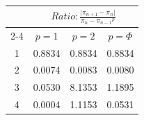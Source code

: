 \documentclass{article}
\providecommand{\abs}[1]{\lvert#1\rvert}
\begin{document}
\begin{tabular}{|c|c|c|c|}
\hline
\n & \multicolumn{3}{|c|}{$Ratio:\displaystyle\frac{\abs{\pi_{n+1}-\pi_{n}}}{{\pi_{n}-\pi_{n-1}}^p}$} \\
\cline{2-4}
 & $p=1$ & $p=2$ & $p=\Phi$ \\
\hline
 1 & 0.8834 & 0.8834 & 0.8834 \\ 
  2 & 0.0074 & 0.0083 & 0.0080 \\ 
  3 & 0.0530 & 8.1353 & 1.1895 \\ 
  4 & 0.0004 & 1.1153 & 0.0531 \\ 
 \hline 
\end{tabular}
\end{document}
